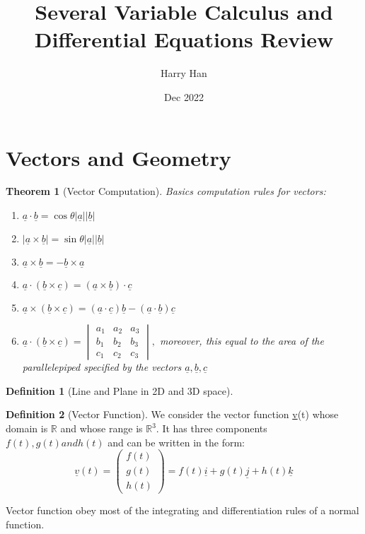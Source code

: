 \documentclass[12pt,a4paper]{article}
\title{Several Variable Calculus and Differential Equations Review}
\author{Harry Han}
\date{Dec 2022}
\newtheorem{theorem}{Theorem}[subsection]
\theoremstyle{definition}
\newtheorem{definition}{Definition}[section]
\theoremstyle{remark}
\begin{document}
\maketitle
\tableofcontents
\newpage

\section{Vectors and Geometry}

\begin{theorem}[Vector Computation]
Basics computation rules for vectors:
	\begin{enumerate}
		\item $\underline{a} \cdot \underline{b} = \cos{\theta}  | \underline{a}| | \underline{b}| $
		\item $| \underline{a} \times \underline{b} | = \sin{\theta}  | \underline{a}| | \underline{b}| $
		\item $ \underline{a} \times \underline{b} = - \underline{b} \times \underline{a} $
		\item $ \underline{a} \cdot (\underline{b} \times \underline{c}) = ( \underline{a}\times \underline{b}) \cdot \underline{c} $
		\item $ \underline{a} \times (\underline{b} \times \underline{c}) = (\underline{a} \cdot \underline{c}) \underline{b} - (\underline{a} \cdot \underline{b}) \underline{c} $
		\item $ \underline{a} \cdot ( \underline{b} \times \underline{c}) = \begin{vmatrix}
			a_1 & a_2 & a_3 \\
			b_1 & b_2 & b_3 \\
			c_1 & c_2 & c_3
			\end{vmatrix}, $ moreover, this equal to the area of the parallelepiped specified by the vectors $ \underline{a}, \underline{b}, \underline{c} $
 	\end{enumerate}
\end{theorem}

\begin{definition}[Line and Plane in 2D and 3D space]
	
\end{definition}

\begin{definition}[Vector Function]
	We consider the vector function \underline{v}(t) whose domain is $ \mathbb{R}$ and whose range is $ \mathbb{R}^3.$ It has three components $f(t), g(t) and h(t)$ and can be written in the form:
\[
\underline{v}(t) = \begin{pmatrix}
f(t) \\
g(t) \\
h(t)
\end{pmatrix} = f(t) \underline{i} + g(t) \underline{j} + h(t) \underline{k}
\]

Vector function obey most of the integrating and differentiation rules of a normal function.
\end{definition}
\end{document}
